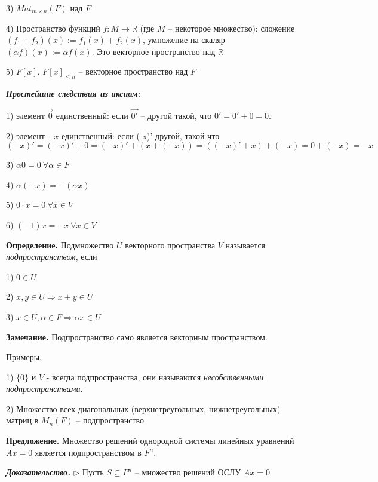 3) $Mat_{m \times n} (F)$ над $F$

4) Пространство функций $f: M \rightarrow \mathbb{R}$ (где $M$ -- некоторое множество): сложение $(f_1 + f_2)(x) := f_1(x) + f_2(x)$, умножение на скаляр $(\alpha f)(x) := \alpha f(x)$. Это векторное пространство над $\mathbb{R}$

5) $F[x]$, $F[x]_{\leq n}$ -- векторное пространство над $F$

\vspace{\baselineskip}
\textbf{\textit{Простейшие следствия из аксиом:}}

1) элемент $\overrightarrow{0}$ единственный: если $\overrightarrow{0'}$ -- другой такой, что $0' = 0' + 0 = 0$. 

2) элемент $-x$ единственный: если (-x)' другой, такой что $(-x)' = (-x)' + 0 = (-x)' + (x + (-x)) = ((-x)' + x) + (-x) = 0 + (-x) = -x$

3) $\alpha 0 = 0 \ \forall \alpha \in F$

4) $\alpha (-x) = -(\alpha x)$

5) $0 \cdot x = 0 \ \forall x \in V$

6) $(-1)x = -x \ \forall x \in V$

\vspace{\baselineskip}
\textbf{Определение.} Подмножество $U$ векторного пространства $V$ называется \textit{подпространством}, если

1) $0 \in U$

2) $x, y \in U \Rightarrow x + y \in U$

3) $x \in U, \alpha \in F \Rightarrow \alpha x \in U$

\vspace{\baselineskip}
\textbf{Замечание.} Подпространство само является векторным пространством.

\vspace{\baselineskip}
Примеры.

1) $\{0\}$ и $V$ - всегда подпространства, они называются \textit{несобственными подпространствами}.

2) Множество всех диагональных (верхнетреугольных, нижнетреугольных) матриц в $M_n (F)$ -- подпространство

\vspace{\baselineskip}
\textbf{Предложение.} Множество решений однородной системы линейных уравнений $Ax = 0$ является подпространством в $F^n$.

\vspace{\baselineskip}
\textbf{\textit{Доказательство.}} $\rhd$ Пусть $S \subseteq F^n$ -- множество решений ОСЛУ $Ax = 0$

